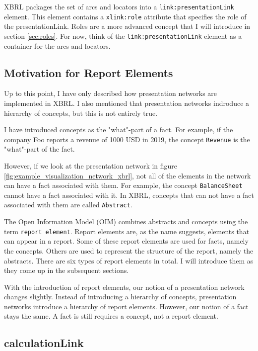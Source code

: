 XBRL packages the set of arcs and locators into a \texttt{link:presentationLink} element.
This element contains a \texttt{xlink:role} attribute that specifies the role of the presentationLink.
Roles are a more advanced concept that I will introduce in section \ref{sec:roles}.
For now, think of the \texttt{link:presentationLink} element as a container for the arcs and locators.

\subsection{Motivation for Report Elements}
\label{sec:report_elements_motivation}

Up to this point, I have only described how presentation networks are implemented in XBRL.
I also mentioned that presentation networks indroduce a hierarchy of concepts, but this is not entirely true.

I have introduced concepts as the "what"-part of a fact. 
For example, if the company Foo reports a revenue of 1000 USD in 2019, the concept \texttt{Revenue} is the "what"-part of the fact.

However, if we look at the presentation network in figure \ref{fig:example_visualization_network_xbrl}, not all of the elements in the network can have a fact associated with them.
For example, the concept \texttt{BalanceSheet} cannot have a fact associated with it.
In XBRL, concepts that can not have a fact associated with them are called \texttt{Abstract}.

The Open Information Model (OIM) combines abstracts and concepts using the term \texttt{report element}.
Report elements are, as the name suggests, elements that can appear in a report.
Some of these report elements are used for facts, namely the concepts.
Others are used to represent the structure of the report, namely the abstracts.
There are six types of report elements in total\cite{oim}. 
I will introduce them as they come up in the subsequent sections.

With the introduction of report elements, our notion of a presentation network changes slightly.
Instead of introducing a hierarchy of concepts, presentation networks introduce a hierarchy of report elements.
However, our notion of a fact stays the same.
A fact is still requires a concept, not a report element.

\subsection{calculationLink}

